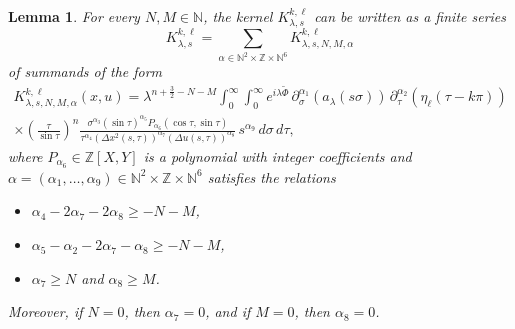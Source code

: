 \documentclass[leqno]{amsart}
\newtheorem{lemma}[theorem]{Lemma}
\theoremstyle{definition}
\theoremstyle{remark}
\numberwithin{equation}{section}
\newcommand{\N}{\mathbb{N}}
\newcommand{\Z}{\mathbb{Z}}
\begin{document}
\begin{lemma}\label{lem:decay-away-2}
For every $N,M\in\N$, the kernel $K_{\lambda,s}^{k,\ell}$ can be written as a finite series
\[
K_{\lambda,s}^{k,\ell} = \sum_{\alpha\in \N^2 \times \Z\times \N^6} K_{\lambda,s,N,M,\alpha}^{k,\ell}
\]
of summands of the form
\begin{multline*}
K_{\lambda,s,N,M,\alpha}^{k,\ell}(x, u)
 = 
\lambda^{n + \frac{3}{2}-N-M} \int_0^\infty \int_0^\infty  e^{i \lambda \tilde \Phi} \,\partial_\sigma^{\alpha_1} (a_{\lambda}(s \sigma))\, \partial_\tau^{\alpha_2}(\eta_\ell(\tau-k \pi))\\
\times \left(\frac{\tau}{\sin \tau}\right)^{n} \frac{\sigma^{\alpha_3} \left(\sin \tau\right)^{\alpha_5} P_{\alpha_6}(\cos\tau,\sin\tau)}{\tau^{\alpha_ 4 } \left( \Delta x^2 (s,\tau) \right)^{\alpha_7}\left( \Delta u(s,\tau) \right)^{\alpha_8} } \, s^{\alpha_9} \, d\sigma \, d \tau,
\end{multline*}
where $P_{\alpha_6}\in \Z[X,Y]$ is a polynomial with integer coefficients and $\alpha = (\alpha_1,\dots,\alpha_9)\in \N^2 \times \Z\times \N^6$ satisfies the relations
\begin{itemize}
 \item $\alpha_ 4 -2\alpha_7-2\alpha_8\ge -N-M$,
 \item $\alpha_5-\alpha_2-2\alpha_7-\alpha_8\ge -N-M$,
 \item $\alpha_7\ge N$ and $\alpha_8\ge M$.
\end{itemize}
Moreover, if $N = 0$, then $\alpha_7 = 0$, and if $M = 0$, then $\alpha_8 = 0$.
\end{lemma}
\end{document}
